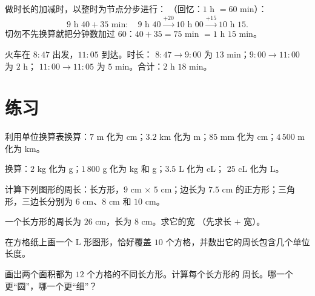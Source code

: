 \begin{method}[跨过整时的时间加减]\label{met:g4:measure:time}
做时长的加减时，以整时为节点分步进行：
（回忆：$1$ h $= 60$ min）：
\[
9\text{ h }40 + 35 \text{ min}:
\quad 9\text{ h }40 \xrightarrow{+20} 10\text{ h }00
\xrightarrow{+15} 10\text{ h }15 .
\]
切勿不先换算就把分钟数加过 $60$：$40 + 35 = 75$ min
$= 1$ h $15$ min。
\end{method}

\begin{example}\label{ex:g4:measure:timetable}
火车在 $8{:}47$ 出发，$11{:}05$ 到达。时长：
$8{:}47 \to 9{:}00$ 为 $13$ min；$9{:}00 \to 11{:}00$ 为 $2$ h；
$11{:}00 \to 11{:}05$ 为 $5$ min。合计：$2$ h $18$ min。
\end{example}

\section{练习}

\begin{exercise}[$\star$]\label{exo:g4:measure:1}
利用单位换算表换算：$7$ m 化为 cm；$3.2$ km 化为 m；$85$ mm 化为
cm；$4\,500$ m 化为 km。
\end{exercise}

\begin{exercise}[$\star$]\label{exo:g4:measure:2}
换算：$2$ kg 化为 g；$1\,800$ g 化为 kg 和 g；$3.5$ L 化为 cL；
$25$ cL 化为 L。
\end{exercise}

\begin{exercise}[$\star$]\label{exo:g4:measure:3}
计算下列图形的周长：长方形，$9$ cm $\times$ $5$ cm；边长为
$7.5$ cm 的正方形；三角形，三边长分别为 $6$ cm、$8$ cm 和 $10$ cm。
\end{exercise}

\begin{exercise}[$\star$]\label{exo:g4:measure:4}
一个长方形的周长为 $26$ cm，长为 $8$ cm。求它的宽
（先求长 $+$ 宽）。
\end{exercise}

\begin{exercise}[$\star$]\label{exo:g4:measure:5}
在方格纸上画一个 L 形图形，恰好覆盖 $10$
个方格，并数出它的周长包含几个单位长度。
\end{exercise}

\begin{exercise}[$\star$]\label{exo:g4:measure:6}
画出两个面积都为 $12$ 个方格的不同长方形。计算每个长方形的
周长。哪一个更“圆”，哪一个更“细”？
\end{exercise}

